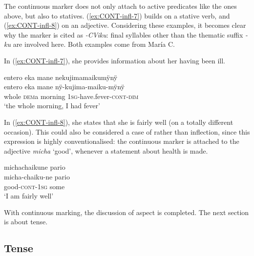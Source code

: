The continuous marker does not only attach to active predicates like the ones above, but also to statives. (\ref{ex:CONT-infl-7}) builds on a stative verb,  and (\ref{ex:CONT-infl-8}) on an adjective. Considering these examples, it becomes clear why the marker is cited as \textit{-CViku}: final syllables other than the thematic suffix \textit{-ku} are involved here. Both examples come from María C.

In (\ref{ex:CONT-infl-7}), she provides information about her having been ill.

\ea\label{ex:CONT-infl-7}
\begingl
\glpreamble entero eka mane nekujimamaikumÿnÿ\\
\gla entero eka mane nÿ-kujima-maiku-mÿnÿ\\
\glb whole \textsc{dem}a morning 1\textsc{sg}-have.fever-\textsc{cont}-\textsc{dim}\\
\glft ‘the whole morning, I had fever’
\endgl
\trailingcitation{[ump-p110815sf.716]}
\xe

In (\ref{ex:CONT-infl-8}), she states that she is fairly well (on a totally different occasion). This could also be considered a case of  rather than inflection, since this expression is highly conventionalised: the continuous marker is attached to the adjective \textit{micha} ‘good’, whenever a statement about health is made.

\ea\label{ex:CONT-infl-8}
\begingl
\glpreamble michachaikune pario\\
\gla micha-chaiku-ne pario\\
\glb good-\textsc{cont}-1\textsc{sg} some\\
\glft ‘I am fairly well’
\endgl
\trailingcitation{[cux-120410ls.020]}
\xe

With continuous marking, the discussion of aspect is completed. The next section is about tense.

\subsection{Tense}\label{sec:Tense}

